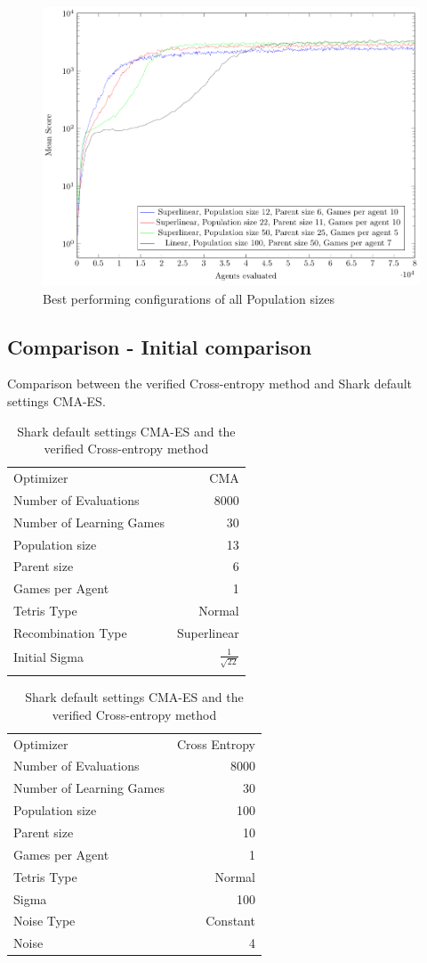 \begin{figure}[H]
\centering
\includegraphics[scale=1]{data/cma_population_offspring/bestofall_population/PlotFile.pdf}
\caption{Best performing configurations of all Population sizes}
\end{figure}



\clearpage

\subsection{Comparison - Initial comparison}
Comparison between the verified Cross-entropy method and Shark \citep{shark08} default settings CMA-ES.

\begin{table}[h]
\centering
\small
\begin{tabular}{l r}
Optimizer & CMA\\
Number of Evaluations & 8000\\
Number of Learning Games & 30\\
Population size& 13\\
Parent size & 6\\
Games per Agent & 1\\
Tetris Type & Normal\\
\hline
Recombination Type & Superlinear\\
Initial Sigma & $\frac{1}{\sqrt{22}}$\\
\quad & \quad
\end{tabular}
\quad
\begin{tabular}{l r}
Optimizer & Cross Entropy\\
Number of Evaluations & 8000\\
Number of Learning Games & 30\\
Population size & 100\\
Parent size & 10\\
Games per Agent & 1\\
Tetris Type & Normal\\
\hline
Sigma & 100\\
Noise Type & Constant\\
Noise & 4
\end{tabular}
\caption{Shark default settings CMA-ES and the verified Cross-entropy method}
\end{table}

